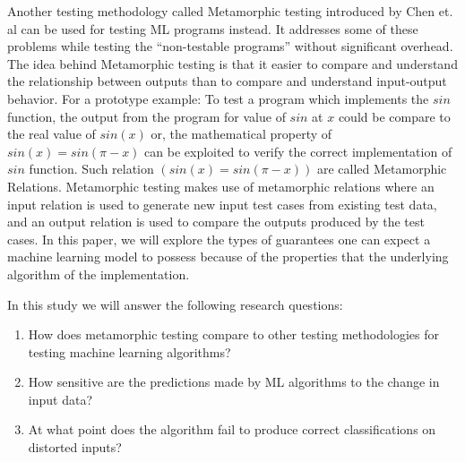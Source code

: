 Another testing methodology called Metamorphic testing introduced by Chen et. al can be used for testing ML programs instead. It addresses some of these problems while testing the \enquote{non-testable programs} without significant overhead. The idea behind Metamorphic testing is that it easier to compare and understand the relationship between outputs than to compare and understand input-output behavior. For a prototype example: To test a program which implements the $sin$ function, the output from the program for value of $sin$ at $x$ could be compare to the real value of $sin(x)$ or, the mathematical property of $sin(x) = sin(\pi-x)$ can be exploited to verify the correct implementation of $sin$ function. Such relation $(sin(x) = sin(\pi-x))$ are called Metamorphic Relations. Metamorphic testing makes use of metamorphic relations where an input relation is used to generate new input test cases from existing test data, and an output relation is used to compare the outputs produced by the test cases.\newline
In this paper, we will explore the types of guarantees one can expect a machine learning model to possess because of the properties that the underlying algorithm of the implementation.


In this study we will answer the following research questions:
\begin{enumerate}
  \item How does metamorphic testing compare to other testing methodologies for testing machine learning algorithms?
  \item How sensitive are the predictions made by ML algorithms to the change in input data?
  \item At what point does the algorithm fail to produce correct classifications on distorted inputs?
\end{enumerate}
%
